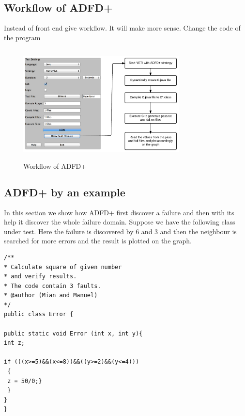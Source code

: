 \documentclass{acm_proc_article-sp}
\begin{document}

\subsection{Workflow of ADFD+}
Instead of front end give workflow. It will make more sense. Change the code of the program

\begin{figure}[ht]
\centering
\includegraphics[width= 8.5cm,height=6cm]{adfdPlusWorkflow.png}
\caption{Workflow of ADFD+}
\label{fig:Workflow}
\end{figure}


\subsection{ADFD+ by an example}
In this section we show how ADFD+ first discover a failure and then with its help it discover the whole failure domain. Suppose we have the following class under test.  Here the failure is discovered by 6 and 3 and then the neighbour is searched for more errors and the result is plotted on the graph.

\begin{lstlisting}
/** 
* Calculate square of given number 
* and verify results. 
* The code contain 3 faults.
* @author (Mian and Manuel)
*/
public class Error {

public static void Error (int x, int y){
int z;

if (((x>=5)&&(x<=8))&&((y>=2)&&(y<=4)))
 {
 z = 50/0;}
 } 
}
}
\end{lstlisting}
\end{document}
